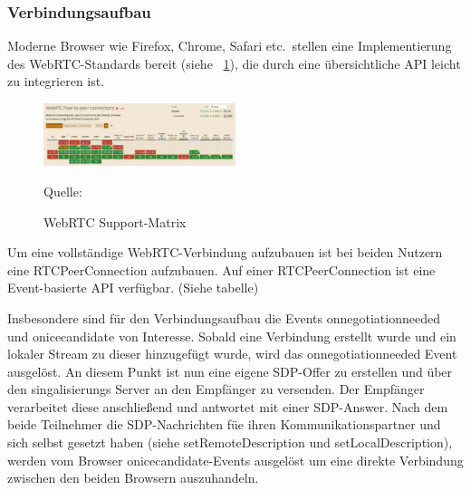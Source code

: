 \documentclass{article}
\newcommand{\figuresource}[1]{
	\begin{center}Quelle: #1\end{center}
}
\begin{document}
\begin{onecolumn}
\subsubsection{Verbindungsaufbau}\label{browser-webrtc}

Moderne Browser wie Firefox, Chrome, Safari etc.\ stellen eine Implementierung
des WebRTC-Standards bereit (siehe \figurename~\ref{fig:webrtc-support}), die
durch eine übersichtliche API leicht zu integrieren ist.

\begin{figure}[ht]
	\includegraphics[width=0.5\textwidth]{webrtc-support}
	\centering
	\caption[WebRTC Support-Matrix~\cite{WebRTCSupport}]{WebRTC Support-Matrix}\label{fig:webrtc-support}
	\figuresource{\cite{WebRTCSupport}}
\end{figure}

Um eine vollständige WebRTC-Verbindung aufzubauen ist bei beiden Nutzern eine
RTCPeerConnection aufzubauen. Auf einer RTCPeerConnection ist eine
Event-basierte API verfügbar. (Siehe tabelle)


Insbesondere sind für den Verbindungsaufbau die Events onnegotiationneeded und
onicecandidate von Interesse. Sobald eine Verbindung erstellt wurde und ein
lokaler Stream zu dieser hinzugefügt wurde, wird das onnegotiationneeded Event
ausgelöst. An diesem Punkt ist nun eine eigene SDP-Offer zu erstellen und über
den singalisierungs Server an den Empfänger zu versenden. Der Empfänger
verarbeitet diese anschließend und antwortet mit einer SDP-Answer. Nach dem
beide Teilnehmer die SDP-Nachrichten füe ihren Kommunikationspartner und sich
selbst gesetzt haben (siehe setRemoteDescription und setLocalDescription),
werden vom Browser onicecandidate-Events ausgelöst um eine direkte Verbindung
zwischen den beiden Browsern auszuhandeln.



\end{onecolumn}
\end{document}
